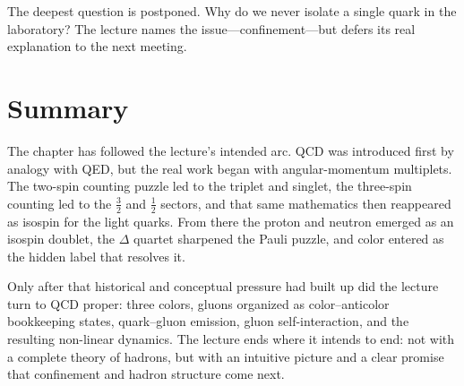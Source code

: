 The deepest question is postponed. Why do we never isolate a single quark in the laboratory? The lecture names the issue---confinement---but defers its real explanation to the next meeting.

\section{Summary}

The chapter has followed the lecture's intended arc. QCD was introduced first by analogy with QED, but the real work began with angular-momentum multiplets. The two-spin counting puzzle led to the triplet and singlet, the three-spin counting led to the \(\tfrac32\) and \(\tfrac12\) sectors, and that same mathematics then reappeared as isospin for the light quarks. From there the proton and neutron emerged as an isospin doublet, the \(\Delta\) quartet sharpened the Pauli puzzle, and color entered as the hidden label that resolves it.

Only after that historical and conceptual pressure had built up did the lecture turn to QCD proper: three colors, gluons organized as color--anticolor bookkeeping states, quark--gluon emission, gluon self-interaction, and the resulting non-linear dynamics. The lecture ends where it intends to end: not with a complete theory of hadrons, but with an intuitive picture and a clear promise that confinement and hadron structure come next.